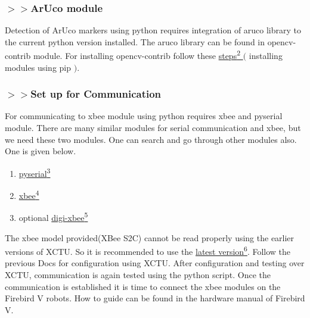 \documentclass[a4paper,12pt,oneside]{book}
\begin{document}
\subsubsection*{$>>$ArUco module}
Detection of ArUco markers using python requires integration of aruco library to the current python version installed. The aruco library can be found in opencv-contrib module. For installing opencv-contrib follow these \href{https://www.youtube.com/watch?v=jnpC_Ib_lbc}{steps\textsuperscript{2} }$($ installing modules using pip $)$. 
\begin{center} 
\framebox{\textcolor{gray}{ pip install opencv-contrib-python }}
\end{center}
\subsubsection*{$>>$Set up for Communication}
For communicating to xbee module using python requires xbee and pyserial module. There are many similar modules for serial communication and xbee, but we need these two modules. One can search and go through other modules also. One is given below.
\begin{enumerate}
\item \href{https://pypi.org/project/pyserial/}{pyserial\textsuperscript{3}}
\begin{center} 
\framebox{\textcolor{gray}{ pip install pyserial }}
\end{center}
\item \href{https://pypi.org/project/XBee/}{xbee\textsuperscript{4}}
\begin{center}
\framebox{\textcolor{gray}{ pip install xbee }}
\end{center}
\item optional \href{https://pypi.org/project/digi-xbee/}{digi-xbee\textsuperscript{5}}
\begin{center}
\fbox{\textcolor{gray}{ pip install digi-xbee }}
\end{center}
\end{enumerate}\vspace{0 em}
The xbee model provided(XBee S2C) cannot be read properly using the earlier versions of XCTU. So it is recommended to use the \href{https://www.digi.com/support/productdetail?pid=3352&type=utilities}{latest version\textsuperscript{6}}. Follow the previous Docs for configuration using XCTU. After configuration and testing over XCTU, communication is again tested using the python script. Once the communication is established it is time to connect the xbee modules on the Firebird V robots. How to guide can be found in the hardware manual of Firebird V.
\end{document}
